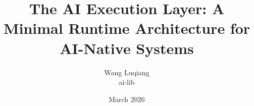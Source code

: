 \documentclass[11pt]{article}
\title{The AI Execution Layer: A Minimal Runtime Architecture for AI-Native Systems}
\author{Wang Luqiang\\ai-lib}
\date{March 2026}
\begin{document}
\maketitle

















\nocite{openai_docs,anthropic_docs,langchain_docs,kubernetes_arch,newman_microservices,burns_borg_kubernetes,consul_service_mesh,cncf_definition}



\end{document}
